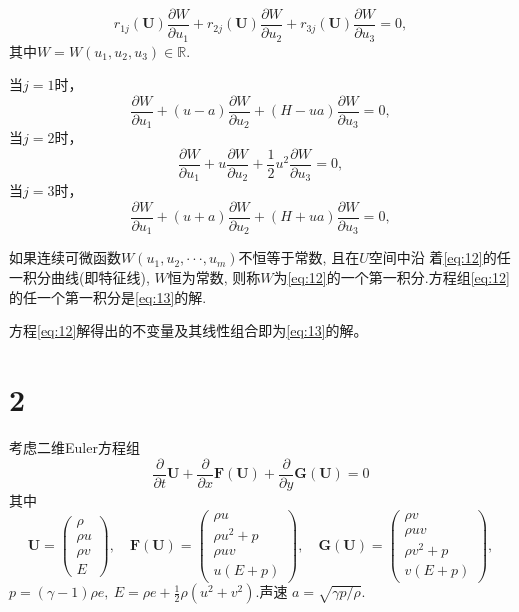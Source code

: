 \documentclass[12pt]{article}
\begin{document}
\begin{equation}
	r_{1 j}(\boldsymbol{U}) \frac{\partial W}{\partial u_{1}}+r_{2 j}(\boldsymbol{U}) \frac{\partial W}{\partial u_{2}}+r_{3 j}(\boldsymbol{U}) \frac{\partial W}{\partial u_{3}}=0,
	\label{eq:13}
\end{equation}
其中$W=W\left(u_{1}, u_{2}, u_{3}\right) \in \mathbb{R}$.

当$j=1$时，
\begin{equation}
	\frac{\partial W}{\partial u_{1}}+(u-a)\frac{\partial W}{\partial u_{2}}+(H-ua)\frac{\partial W}{\partial u_{3}}=0,
\end{equation}
当$j=2$时，
\begin{equation}
	 \frac{\partial W}{\partial u_{1}}+u \frac{\partial W}{\partial u_{2}}+\frac{1}{2}u^2 \frac{\partial W}{\partial u_{3}}=0,
\end{equation}
当$j=3$时，
\begin{equation}
	 \frac{\partial W}{\partial u_{1}}+(u+a) \frac{\partial W}{\partial u_{2}}+(H+ua) \frac{\partial W}{\partial u_{3}}=0,
\end{equation}

如果连续可微函数$W(u_1,u_2,··· ,u_m)$不恒等于常数, 且在$U$空间中沿 着\cref{eq:12}的任一积分曲线(即特征线), $W$恒为常数, 则称$W$为\cref{eq:12}的一个第一积分.方程组\cref{eq:12}的任一个第一积分是\cref{eq:13}的解.

方程\cref{eq:12}解得出的不变量及其线性组合即为\cref{eq:13}的解。

\section{2}

考虑二维Euler方程组
\begin{equation}
	\frac{\partial}{\partial t} \boldsymbol{U}+\frac{\partial}{\partial x} \boldsymbol{F}(\boldsymbol{U})+\frac{\partial}{\partial y} \boldsymbol{G}(\boldsymbol{U})=0
\end{equation}
其中
\begin{equation}
	\boldsymbol{U}=\left(\begin{array}{c}
		\rho \\
		\rho u \\
		\rho v \\
		E
		\end{array}\right), \quad \boldsymbol{F}(\boldsymbol{U})=\left(\begin{array}{c}
		\rho u \\
		\rho u^{2}+p \\
		\rho u v \\
		u(E+p)
		\end{array}\right), \quad \boldsymbol{G}(\boldsymbol{U})=\left(\begin{array}{c}
		\rho v \\
		\rho u v \\
		\rho v^{2}+p \\
		v(E+p)
		\end{array}\right),
\end{equation}
$p=(\gamma-1) \rho e,\ E=\rho e+\frac{1}{2} \rho\left(u^{2}+v^{2}\right)$.声速 $a=\sqrt{\gamma p / \rho} .$
\end{document}

